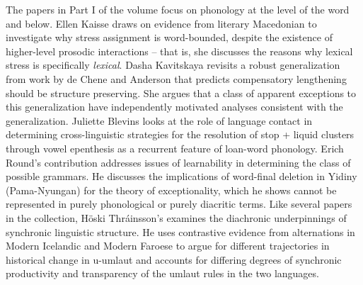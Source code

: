 \begin{refsection}
The papers in Part I of the volume focus on phonology at the level of the word and below. Ellen Kaisse draws on evidence from literary Macedonian to investigate why stress assignment is word-bounded, despite the existence of higher-level prosodic interactions -- that is, she discusses the reasons why lexical stress is specifically \textit{lexical}. Dasha Kavitskaya revisits a robust generalization from work by de Chene and Anderson that predicts compensatory lengthening should be structure preserving. She argues that a class of apparent exceptions to this generalization have independently motivated analyses consistent with the generalization. Juliette Blevins looks at the role of language contact in determining cross-linguistic strategies for the resolution of stop + liquid clusters through vowel epenthesis as a recurrent feature of loan-word phonology. Erich Round's contribution addresses issues of learnability in determining the class of possible grammars. He discusses the implications of word-final deletion in Yidiny (Pama-Nyungan) for the theory of exceptionality, which he shows cannot be represented in purely phonological or purely diacritic terms. Like several papers in the collection, Höski Thráinsson's examines the diachronic underpinnings of synchronic linguistic structure. He uses contrastive evidence from alternations in Modern Icelandic and Modern Faroese to argue for different trajectories in historical change in u-umlaut and accounts for differing degrees of synchronic productivity and transparency of the umlaut rules in the two languages.


\end{refsection}
